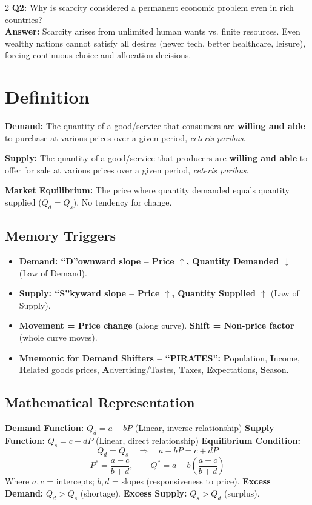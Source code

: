 \documentclass[10pt,a4paper]{article}
\begin{document}
\begin{multicols}{2}
\textbf{Q2:} Why is scarcity considered a permanent economic problem even in rich countries?\\[0.1cm]
\textbf{Answer:} Scarcity arises from unlimited human wants vs. finite resources. Even wealthy nations cannot satisfy all desires (newer tech, better healthcare, leisure), forcing continuous choice and allocation decisions.


\section*{Definition}
\textbf{Demand:} The quantity of a good/service that consumers are \textbf{willing and able} to purchase at various prices over a given period, \textit{ceteris paribus}.

\textbf{Supply:} The quantity of a good/service that producers are \textbf{willing and able} to offer for sale at various prices over a given period, \textit{ceteris paribus}.

\textbf{Market Equilibrium:} The price where quantity demanded equals quantity supplied ($Q_d = Q_s$). No tendency for change.

\subsection*{Memory Triggers}
\begin{itemize}[leftmargin=*,nosep]
    \item \textbf{Demand: ``D''ownward slope -- Price $\uparrow$, Quantity Demanded $\downarrow$} (Law of Demand).
    \item \textbf{Supply: ``S''kyward slope -- Price $\uparrow$, Quantity Supplied $\uparrow$} (Law of Supply).
    \item \textbf{Movement = Price change} (along curve). \textbf{Shift = Non-price factor} (whole curve moves).
    \item \textbf{Mnemonic for Demand Shifters -- ``PIRATES'':} \textbf{P}opulation, \textbf{I}ncome, \textbf{R}elated goods prices, \textbf{A}dvertising/Tastes, \textbf{T}axes, \textbf{E}xpectations, \textbf{S}eason.
\end{itemize}

\subsection*{Mathematical Representation}
\textbf{Demand Function:} $Q_d = a - bP$ \quad (Linear, inverse relationship)
\textbf{Supply Function:} $Q_s = c + dP$ \quad (Linear, direct relationship)
\textbf{Equilibrium Condition:}
\[
Q_d = Q_s \quad \Rightarrow \quad a - bP = c + dP
\]
\[
P^* = \frac{a-c}{b+d}, \qquad Q^* = a - b\left(\frac{a-c}{b+d}\right)
\]
Where $a, c$ = intercepts; $b, d$ = slopes (responsiveness to price).
\textbf{Excess Demand:} $Q_d > Q_s$ (shortage). \textbf{Excess Supply:} $Q_s > Q_d$ (surplus).


\end{multicols}
\end{document}
